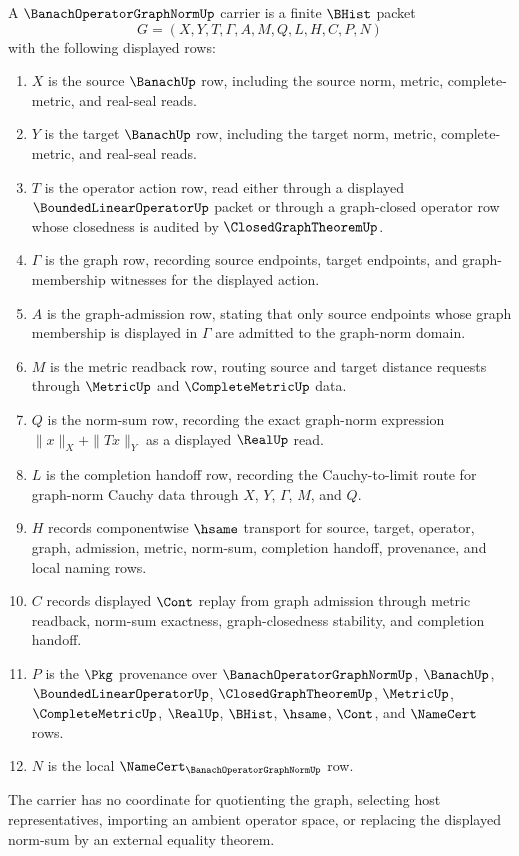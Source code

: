 \begin{definition}
\label{def:banach-operator-graph-norm-carrier}
A $\BanachOperatorGraphNormUp$ carrier is a finite $\BHist$ packet
$$
G=(X,Y,T,\Gamma,A,M,Q,L,H,C,P,N)
$$
with the following displayed rows:
\begin{enumerate}
\item $X$ is the source $\BanachUp$ row, including the source norm, metric, complete-metric, and real-seal reads.
\item $Y$ is the target $\BanachUp$ row, including the target norm, metric, complete-metric, and real-seal reads.
\item $T$ is the operator action row, read either through a displayed $\BoundedLinearOperatorUp$ packet or through a graph-closed operator row whose closedness is audited by $\ClosedGraphTheoremUp$.
\item $\Gamma$ is the graph row, recording source endpoints, target endpoints, and graph-membership witnesses for the displayed action.
\item $A$ is the graph-admission row, stating that only source endpoints whose graph membership is displayed in $\Gamma$ are admitted to the graph-norm domain.
\item $M$ is the metric readback row, routing source and target distance requests through $\MetricUp$ and $\CompleteMetricUp$ data.
\item $Q$ is the norm-sum row, recording the exact graph-norm expression $\|x\|_X+\|T x\|_Y$ as a displayed $\RealUp$ read.
\item $L$ is the completion handoff row, recording the Cauchy-to-limit route for graph-norm Cauchy data through $X$, $Y$, $\Gamma$, $M$, and $Q$.
\item $H$ records componentwise $\hsame$ transport for source, target, operator, graph, admission, metric, norm-sum, completion handoff, provenance, and local naming rows.
\item $C$ records displayed $\Cont$ replay from graph admission through metric readback, norm-sum exactness, graph-closedness stability, and completion handoff.
\item $P$ is the $\Pkg$ provenance over $\BanachOperatorGraphNormUp$, $\BanachUp$, $\BoundedLinearOperatorUp$, $\ClosedGraphTheoremUp$, $\MetricUp$, $\CompleteMetricUp$, $\RealUp$, $\BHist$, $\hsame$, $\Cont$, and $\NameCert$ rows.
\item $N$ is the local $\NameCert_{\BanachOperatorGraphNormUp}$ row.
\end{enumerate}
The carrier has no coordinate for quotienting the graph, selecting host representatives, importing an ambient operator space, or replacing the displayed norm-sum by an external equality theorem.
\end{definition}

